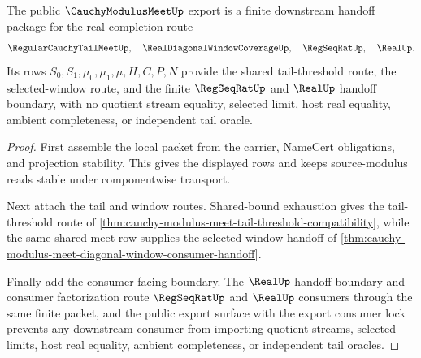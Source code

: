 \begin{theorem}
\label{thm:cauchy-modulus-meet-downstream-unblock-package}
The public $\CauchyModulusMeetUp$ export is a finite downstream handoff package for the real-completion route
$$
\RegularCauchyTailMeetUp,\quad \RealDiagonalWindowCoverageUp,\quad \RegSeqRatUp,\quad \RealUp.
$$
Its rows $S_0,S_1,\mu_0,\mu_1,\mu,H,C,P,N$ provide the shared tail-threshold route, the selected-window route, and the finite $\RegSeqRatUp$ and $\RealUp$ handoff boundary, with no quotient stream equality, selected limit, host real equality, ambient completeness, or independent tail oracle.
\end{theorem}
\begin{proof}
First assemble the local packet from the carrier, NameCert obligations, and projection stability. This gives the displayed rows and keeps source-modulus reads stable under componentwise transport.

Next attach the tail and window routes. Shared-bound exhaustion gives the tail-threshold route of \autoref{thm:cauchy-modulus-meet-tail-threshold-compatibility}, while the same shared meet row supplies the selected-window handoff of \autoref{thm:cauchy-modulus-meet-diagonal-window-consumer-handoff}.

Finally add the consumer-facing boundary. The $\RealUp$ handoff boundary and consumer factorization route $\RegSeqRatUp$ and $\RealUp$ consumers through the same finite packet, and the public export surface with the export consumer lock prevents any downstream consumer from importing quotient streams, selected limits, host real equality, ambient completeness, or independent tail oracles.
\end{proof}

